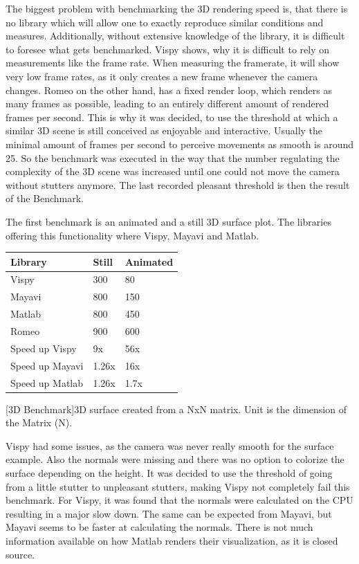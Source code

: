 The biggest problem with benchmarking the 3D rendering speed is, that there is no library which will allow one to exactly reproduce similar conditions and measures. 
Additionally, without extensive knowledge of the library, it is difficult to foresee what gets benchmarked. 
Vispy shows, why it is difficult to rely on measurements like the frame rate. 
When measuring the framerate, it will show very low frame rates, as it only creates a new frame whenever the camera changes.
Romeo on the other hand, has a fixed render loop, which renders as many frames as possible, leading to an entirely different amount of rendered frames per second. 
This is why it was decided, to use the threshold at which a similar 3D scene is still conceived as enjoyable and interactive. Usually the minimal amount of frames per second to perceive movements as smooth is around 25.
So the benchmark was executed in the way that the number regulating the complexity of the 3D scene was increased until one could not move the camera without stutters anymore. The last recorded pleasant threshold is then the result of the Benchmark.

The first benchmark is an animated and a still 3D surface plot. The libraries offering this functionality where Vispy, Mayavi and Matlab.

\begin{table}[htbp]
    \centering
    \begin{tabular}{l|l|l}
        \hline
        \textbf{Library} & \textbf{Still} & \textbf{Animated} \\
        \hline
        Vispy            & 300            & 80    \\
        Mayavi           & 800            & 150   \\
        Matlab           & 800            & 450   \\
        Romeo            & 900            & 600   \\
        \hline
        \hline
        Speed up Vispy   & 9x            & 56x   \\
        Speed up Mayavi  & 1.26x         & 16x   \\
        Speed up Matlab  & 1.26x         & 1.7x  \\
    \end{tabular}
    [3D Benchmark]{3D surface created from a NxN matrix. Unit is the dimension of the Matrix (N).}
    \label{table:relativespeedoglw}
\end{table}
Vispy had some issues, as the camera was never really smooth for the surface example. Also the normals were missing and there was no option to colorize the surface depending on the height.
It was decided to use the threshold of going from a little stutter to unpleasant stutters, making Vispy not completely fail this benchmark.
For Vispy, it was found that the normals were calculated on the CPU resulting in a major slow down\cite{VispyGithub}. The same can be expected from Mayavi, but Mayavi seems to be faster at calculating the normals.
There is not much information available on how Matlab renders their visualization, as it is closed source.

